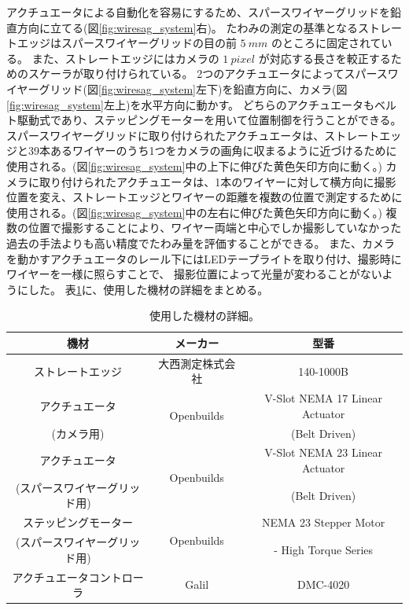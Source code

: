 \documentclass[../../main.tex]{subfiles}
\begin{document}
アクチュエータによる自動化を容易にするため、スパースワイヤーグリッドを鉛直方向に立てる(図\ref{fig:wiresag_system}右)。
たわみの測定の基準となるストレートエッジはスパースワイヤーグリッドの目の前 $\SI{5}{mm}$ のところに固定されている。
また、ストレートエッジにはカメラの $\SI{1}{pixel}$ が対応する長さを較正するためのスケーラが取り付けられている。
2つのアクチュエータによってスパースワイヤーグリッド(図\ref{fig:wiresag_system}左下)を鉛直方向に、カメラ(図\ref{fig:wiresag_system}左上)を水平方向に動かす。
どちらのアクチュエータもベルト駆動式であり、ステッピングモーターを用いて位置制御を行うことができる。
スパースワイヤーグリッドに取り付けられたアクチュエータは、ストレートエッジと39本あるワイヤーのうち1つをカメラの画角に収まるように近づけるために使用される。(図\ref{fig:wiresag_system}中の上下に伸びた黄色矢印方向に動く。)
カメラに取り付けられたアクチュエータは、1本のワイヤーに対して横方向に撮影位置を変え、ストレートエッジとワイヤーの距離を複数の位置で測定するために使用される。(図\ref{fig:wiresag_system}中の左右に伸びた黄色矢印方向に動く。)
複数の位置で撮影することにより、ワイヤー両端と中心でしか撮影していなかった過去の手法よりも高い精度でたわみ量を評価することができる。
また、カメラを動かすアクチュエータのレール下にはLEDテープライトを取り付け、撮影時にワイヤーを一様に照らすことで、
撮影位置によって光量が変わることがないようにした。
表\ref{tab:wiresag_equipment}に、使用した機材の詳細をまとめる。
\begin{table}[H]
    \centering
    \caption{使用した機材の詳細。}
    \begin{tabular}{ccc}
        \hline\hline
        機材 & メーカー & 型番 \\
        \hline
        ストレートエッジ & 大西測定株式会社 & 140-1000B \\
        \hline
        アクチュエータ & \multirow{2}{*}{Openbuilds} & V-Slot NEMA 17 Linear Actuator\\
        (カメラ用) & & (Belt Driven) \\
        \hline
        アクチュエータ & \multirow{2}{*}{Openbuilds} & V-Slot NEMA 23 Linear Actuator \\
        (スパースワイヤーグリッド用) & & (Belt Driven) \\
        \hline
        ステッピングモーター & \multirow{2}{*}{Openbuilds} & NEMA 23 Stepper Motor \\
        (スパースワイヤーグリッド用) & & - High Torque Series \\
        \hline
        アクチュエータコントローラ & Galil & DMC-4020 \\
        \hline\hline
    \end{tabular}
    \label{tab:wiresag_equipment}
\end{table}
\end{document}
